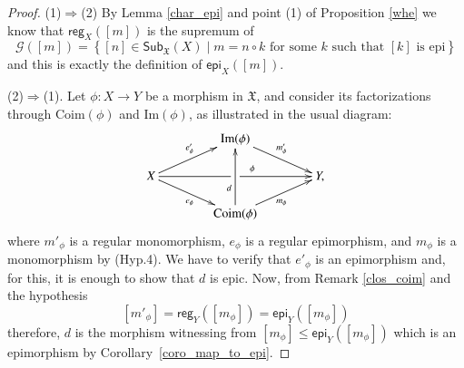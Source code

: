 \documentclass[12pt]{article}
\theoremstyle{definition}
\def\X{\mathfrak X}
\def\Coim{\mathrm{Coim}}
\def\Im{\mathrm{Im}}
\numberwithin{equation}{section}
\newcommand{\catname}[1]{\mathbf{#1}}
\newcommand{\sub}[1]{\mathsf{Sub}_{\catname{#1}}}
\def\epi{\mathsf{epi}}
\def\reg{\mathsf{reg}}
\begin{document}
\begin{proof} 
	(1)$\Rightarrow$(2) By Lemma \ref{char_epi} and point (1) of Proposition \ref{whe} we know that $\reg_X([m])$ is the supremum of
	\[
	\mathcal{G}([m])=\left\{[n]\in  \sub{\X}(X) \mid m=n\circ k \text{ for some } k \text{ such that } [k] \text{ is epi}  \right\}
	\]
	and this is exactly the definition of $\epi_{X}([m])$.
	
	\smallskip \noindent 
	(2)$\Rightarrow$(1). Let $\phi\colon X\to Y$ be a morphism in $\X$, and consider its factorizations through $\Coim(\phi)$ and $\Im(\phi)$, as illustrated in the usual diagram:
	\[
	\xymatrix@C=40pt@R=15pt{
		& \Im(\phi) \ar[dr]^{m'_\phi}  &  \\ 
		X \ar[ru]^{e'_\phi} \ar[rr]|-{\ \ \ }^(0.6){\phi}\ar[dr]_{e_\phi}&  & Y,\\
		& \Coim(\phi) \ar[ur]_{m_\phi} \ar[uu]^(0.35){d}&
	}
	\]
	where $m'_\phi$ is a regular monomorphism, $e_\phi$ is a regular epimorphism, and $m_\phi$ is a monomorphism by (Hyp.4). We have to verify that $e'_\phi$ is an epimorphism and, for this, it is enough to show that $d$ is epic. 
	Now, from Remark \ref{clos_coim} and the hypothesis
	\[[m'_\phi]=\reg_Y([m_\phi])=\epi_Y([m_\phi])\]
	 therefore, $d$ is the morphism witnessing from $[m_\phi] \leq \epi_Y([m_\phi ])$ which is an epimorphism by Corollary~\ref{coro_map_to_epi}.
\end{proof} 
\end{document}
